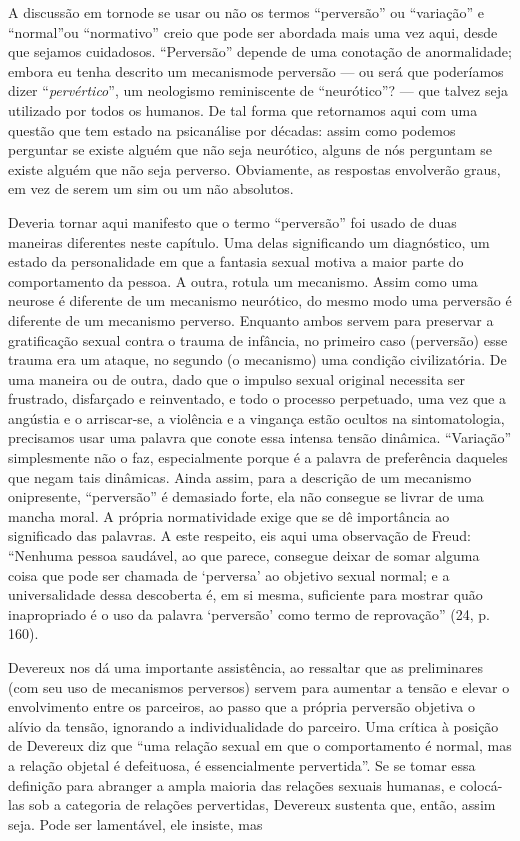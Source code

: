 A discussão em torno\idxpervnorma[|(] de se usar ou não os termos
``perversão'' ou ``variação''\idxvaria{} e
``normal''\idxnorma[|(] ou ``normativo'' creio que pode ser abordada
mais uma vez aqui, desde que sejamos cuidadosos.
``Perversão'' depende de uma conotação de
anormalidade; embora eu tenha descrito um mecanismo\idxmecap[|(] de perversão ---
ou será que poderíamos dizer ``\emph{pervértico}'',
um neologismo reminiscente de ``neurótico''?
--- que talvez seja utilizado por todos os humanos. De tal forma que
retornamos aqui com uma questão que tem estado na psicanálise por
décadas: assim como podemos perguntar se existe alguém que não seja
neurótico, alguns de nós perguntam se existe alguém que não seja
perverso. Obviamente, as respostas envolverão graus, em vez de serem
um sim ou um não absolutos.

Deveria tornar aqui manifesto que o termo
``perversão'' foi usado de duas maneiras
diferentes neste capítulo. Uma delas significando um diagnóstico, um
estado da personalidade em que a fantasia sexual motiva a maior parte
do comportamento da pessoa. A outra, rotula um mecanismo. Assim como
uma neurose é diferente de um mecanismo neurótico, do mesmo modo uma
perversão é diferente de um mecanismo perverso. Enquanto ambos servem
para preservar a gratificação sexual contra o trauma de infância, no
primeiro caso (perversão) esse trauma era um ataque, no segundo (o
mecanismo) uma condição civilizatória. De uma maneira ou de outra, dado
que o impulso sexual original necessita ser frustrado, disfarçado e
reinventado, e todo o processo perpetuado, uma vez que a angústia e o
arriscar-se, a violência e a vingança estão ocultos na sintomatologia,
precisamos usar uma palavra que conote essa intensa tensão dinâmica.
``Variação''\idxvaria{} simplesmente não o faz,
especialmente porque é a palavra de preferência daqueles que negam tais
dinâmicas. Ainda assim, para a descrição de um mecanismo onipresente,
``perversão'' é demasiado forte, ela não
consegue se livrar de uma mancha moral. A própria normatividade exige
que se dê importância ao significado das palavras. A este respeito, eis
aqui uma observação de Freud:\idxfreudperve{} ``Nenhuma pessoa saudável,
ao que parece, consegue deixar de somar alguma coisa que pode ser
chamada de `perversa' ao objetivo
sexual normal; e a universalidade dessa descoberta é, em si mesma,
suficiente para mostrar quão inapropriado é o uso da palavra
`perversão' como termo de
reprovação'' (24, p.\,160).

Devereux\idxdever{} nos dá uma importante assistência, ao ressaltar que as
preliminares\idxpreli{} (com seu uso de mecanismos perversos) servem para aumentar
a tensão e elevar o envolvimento entre os parceiros, ao passo que a
própria perversão objetiva o alívio da tensão,\idxdesu{} ignorando a
individualidade do parceiro. Uma crítica à posição de Devereux diz que
``uma relação sexual em que o comportamento é normal, mas
a relação objetal\idxpervrelac{} é defeituosa, é essencialmente pervertida''. Se se
tomar essa definição para abranger a ampla maioria das relações sexuais
humanas, e colocá-las sob a categoria de relações pervertidas, Devereux
sustenta que, então, assim seja. Pode ser lamentável, ele insiste, mas

